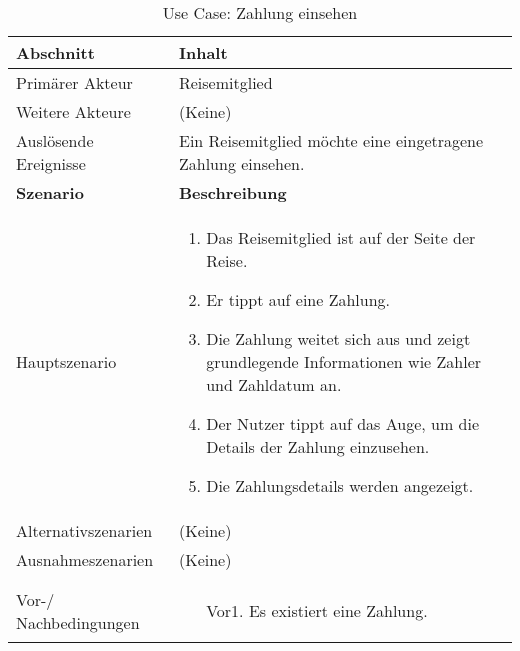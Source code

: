 \begin{table}[H]
	\footnotesize
	\caption{Use Case: Zahlung einsehen}
	\begin{tabularx}{0.95\textwidth}{ |l|X| }
		\hline
		\rowcolor{gray} \textbf{Abschnitt}     & \textbf{Inhalt}                                                                                    \\
		\hline
		Primärer Akteur                        & Reisemitglied                                                                                      \\
		\hline
		Weitere Akteure                        & (Keine)                                                                                            \\
		\hline
		Auslösende Ereignisse                  & Ein Reisemitglied möchte eine eingetragene Zahlung einsehen.                                       \\
		\hline
		\rowcolor{lightgray} \textbf{Szenario} & \textbf{Beschreibung}                                                                              \\
		\hline
		Hauptszenario                          & \begin{enumerate}
			                                         \item Das Reisemitglied ist auf der Seite der Reise.
			                                         \item Er tippt auf eine Zahlung.
			                                         \item Die Zahlung weitet sich aus und zeigt grundlegende Informationen wie Zahler und Zahldatum an.
			                                         \item Der Nutzer tippt auf das Auge, um die Details der Zahlung einzusehen.
			                                         \item Die Zahlungsdetails werden angezeigt.
		                                         \end{enumerate} \\
		\hline
		Alternativszenarien                    & (Keine)                                                                                            \\
		\hline
		Ausnahmeszenarien                      & (Keine)                                                                                            \\
		\hline
		\rowcolor{lightgray}                   &                                                                                                    \\
		\hline
		Vor-/ Nachbedingungen                  & \begin{enumerate}
			                                         \item[Vor1.] Es existiert eine Zahlung.
		                                         \end{enumerate}                                                             \\
		\hline
	\end{tabularx}
\end{table}



